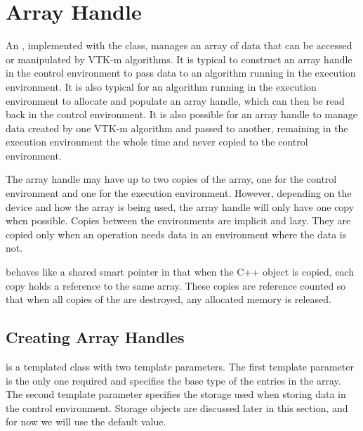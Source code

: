 

\section{Array Handle}
\label{sec:ArrayHandle}


An , implemented with the 
class, manages an array of data that can be accessed or manipulated by VTK-m
algorithms. It is typical to construct an array handle in the control
environment to pass data to an algorithm running in the execution
environment. It is also typical for an algorithm running in the execution
environment to allocate and populate an array handle, which can then be
read back in the control environment. It is also possible for an array
handle to manage data created by one VTK-m algorithm and passed to another,
remaining in the execution environment the whole time and never copied to
the control environment.

The array handle may have up to two copies of the array, one for the
control environment and one for the execution environment. However,
depending on the device and how the array is being used, the array handle
will only have one copy when possible. Copies between the environments are
implicit and lazy. They are copied only when an operation needs data in an
environment where the data is not.

 behaves like a shared smart pointer in that when the
C++ object is copied, each copy holds a reference to the same array. These
copies are reference counted so that when all copies of the
 are destroyed, any allocated memory is released.

\subsection{Creating Array Handles}

 is a templated class with two template
parameters. The first template parameter is the only one required and
specifies the base type of the entries in the array. The second template
parameter specifies the storage used when storing data in the control
environment. Storage objects are discussed later in this section, and for
now we will use the default value.

